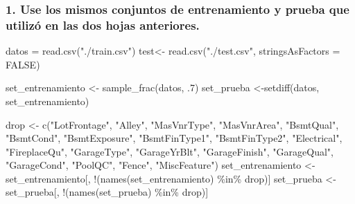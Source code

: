 \documentclass[
]{article}
\newenvironment{Shaded}{\begin{snugshade}}{\end{snugshade}}
\newcommand{\AttributeTok}[1]{\textcolor[rgb]{0.77,0.63,0.00}{#1}}
\newcommand{\ConstantTok}[1]{\textcolor[rgb]{0.00,0.00,0.00}{#1}}
\newcommand{\DecValTok}[1]{\textcolor[rgb]{0.00,0.00,0.81}{#1}}
\newcommand{\FunctionTok}[1]{\textcolor[rgb]{0.00,0.00,0.00}{#1}}
\newcommand{\NormalTok}[1]{#1}
\newcommand{\OtherTok}[1]{\textcolor[rgb]{0.56,0.35,0.01}{#1}}
\newcommand{\SpecialCharTok}[1]{\textcolor[rgb]{0.00,0.00,0.00}{#1}}
\newcommand{\StringTok}[1]{\textcolor[rgb]{0.31,0.60,0.02}{#1}}
\begin{document}
\hypertarget{use-los-mismos-conjuntos-de-entrenamiento-y-prueba-que-utilizuxf3-en-las-dos-hojas-anteriores.}{%
\subsubsection{1. Use los mismos conjuntos de entrenamiento y prueba que
utilizó en las dos hojas
anteriores.}\label{use-los-mismos-conjuntos-de-entrenamiento-y-prueba-que-utilizuxf3-en-las-dos-hojas-anteriores.}}

\begin{Shaded}
\begin{Highlighting}[]
\NormalTok{datos }\OtherTok{=} \FunctionTok{read.csv}\NormalTok{(}\StringTok{"./train.csv"}\NormalTok{)}
\NormalTok{test}\OtherTok{\textless{}{-}} \FunctionTok{read.csv}\NormalTok{(}\StringTok{"./test.csv"}\NormalTok{, }\AttributeTok{stringsAsFactors =} \ConstantTok{FALSE}\NormalTok{)}
\end{Highlighting}
\end{Shaded}

\begin{Shaded}
\begin{Highlighting}[]
\NormalTok{set\_entrenamiento }\OtherTok{\textless{}{-}} \FunctionTok{sample\_frac}\NormalTok{(datos, .}\DecValTok{7}\NormalTok{)}
\NormalTok{set\_prueba }\OtherTok{\textless{}{-}}\FunctionTok{setdiff}\NormalTok{(datos, set\_entrenamiento)}


\NormalTok{drop }\OtherTok{\textless{}{-}} \FunctionTok{c}\NormalTok{(}\StringTok{"LotFrontage"}\NormalTok{, }\StringTok{"Alley"}\NormalTok{, }\StringTok{"MasVnrType"}\NormalTok{, }\StringTok{"MasVnrArea"}\NormalTok{, }\StringTok{"BsmtQual"}\NormalTok{, }\StringTok{"BsmtCond"}\NormalTok{, }\StringTok{"BsmtExposure"}\NormalTok{, }\StringTok{"BsmtFinType1"}\NormalTok{, }\StringTok{"BsmtFinType2"}\NormalTok{, }\StringTok{"Electrical"}\NormalTok{, }\StringTok{"FireplaceQu"}\NormalTok{, }\StringTok{"GarageType"}\NormalTok{, }\StringTok{"GarageYrBlt"}\NormalTok{, }\StringTok{"GarageFinish"}\NormalTok{, }\StringTok{"GarageQual"}\NormalTok{, }\StringTok{"GarageCond"}\NormalTok{, }\StringTok{"PoolQC"}\NormalTok{, }\StringTok{"Fence"}\NormalTok{, }\StringTok{"MiscFeature"}\NormalTok{)}
\NormalTok{set\_entrenamiento }\OtherTok{\textless{}{-}}\NormalTok{ set\_entrenamiento[, }\SpecialCharTok{!}\NormalTok{(}\FunctionTok{names}\NormalTok{(set\_entrenamiento) }\SpecialCharTok{\%in\%}\NormalTok{ drop)]}
\NormalTok{set\_prueba }\OtherTok{\textless{}{-}}\NormalTok{ set\_prueba[, }\SpecialCharTok{!}\NormalTok{(}\FunctionTok{names}\NormalTok{(set\_prueba) }\SpecialCharTok{\%in\%}\NormalTok{ drop)]}
\end{Highlighting}
\end{Shaded}
\end{document}
